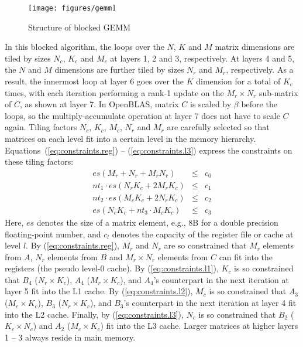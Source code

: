\begin{figure}[t]
  \centering
  \texttt{[image: figures/gemm]}
  \caption{Structure of blocked GEMM}
  \label{fig:gemm}
\end{figure}

In this blocked algorithm, the loops over the $N$, $K$ and $M$
matrix dimensions are tiled by sizes $N_c$, $K_c$ and $M_c$ at 
layers 1, 2 and 3, respectively.
At layers 4 and 5, the $N$ and $M$ dimensions are further tiled by sizes
$N_r$ and $M_r$, respectively.
As a result, the innermost loop at layer 6 goes over the $K$
dimension for a total of $K_c$ times,
with each iteration performing a rank-1 update on
the $M_r \times N_r$ sub-matrix of $C$, as shown at layer 7.
In OpenBLAS, matrix $C$ is scaled by $\beta$ before the loops,
so the multiply-accumulate operation at layer 7 does not have to scale $C$ again.
Tiling factors $N_c$, $K_c$, $M_c$, $N_r$ and $M_r$ are carefully selected so that
matrices on each level fit into a certain level in the memory hierarchy.
Equations~(\ref{eq:constraints.reg}) -- (\ref{eq:constraints.l3}) express
the constraints on these tiling factors:
\begin{eqnarray}
  es (M_r + N_r + M_r N_r) & \le & c_{0} \label{eq:constraints.reg}\\
  nt_{1} \cdot es (N_r K_c + 2 M_r K_c) & \le & c_{1} \label{eq:constraints.l1}\\
  nt_{2} \cdot es (M_c K_c + 2 N_r K_c) & \le & c_{2} \label{eq:constraints.l2}\\
  es (N_c K_c + nt_{3} \cdot M_c K_c)   & \le & c_{3} \label{eq:constraints.l3}
\end{eqnarray}
Here, $es$ denotes the size of a matrix element,
e.g., 8B for a double precision floating-point number,
and $c_l$ denotes the capacity of the register file or cache at level $l$.
By (\ref{eq:constraints.reg}), $M_r$ and $N_r$ are so
constrained that $M_r$ elements from $A$,
$N_r$ elements from $B$ and $M_r \times N_r$ elements from $C$ can
fit into the registers (the pseudo level-0 cache).
By (\ref{eq:constraints.l1}), $K_c$ is so constrained that $B_4$ ($N_r \times K_c$),
$A_4$ ($M_r \times K_c$), and $A_4$'s counterpart in the next iteration
at layer 5 fit into the L1 cache.
By (\ref{eq:constraints.l2}), $M_c$ is so constrained that $A_3$ ($M_c \times K_c$),
$B_3$ ($N_r \times K_c$), and $B_3$'s counterpart in the next iteration
at layer 4 fit into the L2 cache.
Finally, by (\ref{eq:constraints.l3}), $N_c$ is so constrained that 
$B_2$ ($K_c \times N_c$) and $A_2$ ($M_c \times K_c$) fit into the L3 cache.
Larger matrices at higher layers 1 -- 3 always reside in main memory.

